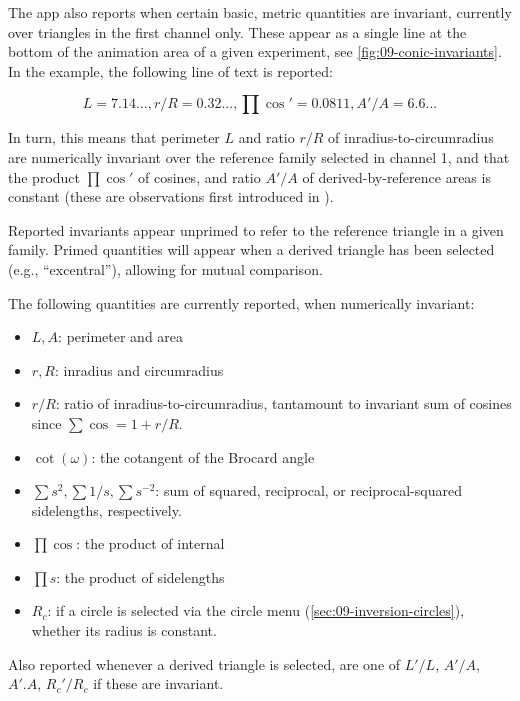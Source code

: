 The app also reports when certain basic, metric quantities are invariant, currently over triangles in the first channel only. These appear as a single line at the bottom of the animation area of a given experiment, see \cref{fig:09-conic-invariants}. In the example, the following line of text is reported:

\[ L=7.14..., r/R=0.32..., \prod\cos'=0.0811, A'/A=6.6... \]

In turn, this means that perimeter $L$ and ratio $r/R$ of inradius-to-circumradius are  numerically invariant over the reference family selected in channel 1, and that the product $\prod\cos'$ of cosines, and ratio $A'/A$ of derived-by-reference areas is constant (these are observations first introduced in \cite{reznik2020-intelligencer}).

Reported invariants appear unprimed to refer to the reference triangle in a given family. Primed quantities will appear when a derived triangle has been selected (e.g., ``excentral''), allowing for mutual comparison. 

The following quantities are currently reported, when numerically invariant:

\begin{itemize}
    \item $L,A$: perimeter and area
    \item $r,R$: inradius and circumradius
    \item $r/R$: ratio of inradius-to-circumradius, tantamount to invariant sum of cosines since $\sum{\cos}=1+r/R$.
    \item $\cot(\omega)$: the cotangent of the Brocard angle
    \item $\sum{s^2},\sum{1/s},\sum{s^{-2}}$: sum of squared, reciprocal, or reciprocal-squared sidelengths, respectively.
    \item $\prod\cos$: the product of internal
    \item $\prod{s}$: the product of sidelengths
    \item $R_c$: if a circle is selected via the circle menu (\cref{sec:09-inversion-circles}), whether its radius is constant.
\end{itemize}

Also reported whenever a derived triangle is selected, are one of $L'/L$, $A'/A$, $A'.A$, $R_c'/R_c$ if these are invariant.